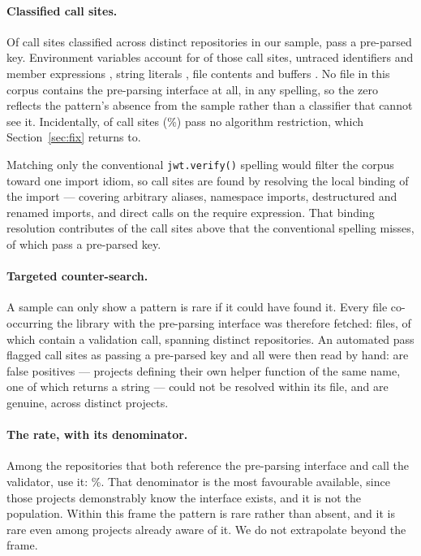 \documentclass[pdflatex,sn-basic,twocolumn]{sn-jnl}%
\begin{document}
\paragraph{Classified call sites.} Of \SampleCallSites{} call sites classified
across \SampleRepos{} distinct repositories in our sample,
\SampleSitesPreparsed{} pass a pre-parsed key. Environment variables account for
\SampleEnvString{} of those call sites, untraced identifiers and member
expressions \SampleUnknown{}, string literals \SampleStringLiteral{}, file
contents \SampleFileContents{} and buffers \SampleBuffer. No file in this corpus
contains the pre-parsing interface at all, in any spelling, so the zero reflects
the pattern's absence from the sample rather than a classifier that cannot see
it. Incidentally, \SampleNoAlgorithms{} of \SampleCallSites{} call sites
(\SampleNoAlgorithmsPct\%) pass no algorithm restriction, which
Section~\ref{sec:fix} returns to.

Matching only the conventional \texttt{jwt.verify()} spelling would filter the
corpus toward one import idiom, so call sites are found by resolving the local
binding of the import --- covering arbitrary aliases, namespace imports,
destructured and renamed imports, and direct calls on the require expression.
That binding resolution contributes \SampleRematchAdded{} of the call sites
above that the conventional spelling misses, of which \RematchSitesPreparsed{}
pass a pre-parsed key.

\paragraph{Targeted counter-search.} A sample can only show a pattern is rare if
it could have found it. Every file co-occurring the library with the pre-parsing
interface was therefore fetched: \CounterFilesFetched{} files, of which
\CounterWithVerify{} contain a validation call, spanning
\CounterReposWithVerify{} distinct repositories. An automated pass flagged
\AdjudicatedTotal{} call sites as passing a pre-parsed key and all were then read
by hand: \AdjudicatedFalsePositive{} are false positives --- projects defining
their own helper function of the same name, one of which returns a string ---
\AdjudicatedUnresolved{} could not be resolved within its file, and
\AdjudicatedGenuine{} are genuine, across \AdjudicatedGenuineProjects{} distinct
projects.

\paragraph{The rate, with its denominator.} Among the \CounterReposWithVerify{}
repositories that both reference the pre-parsing interface and call the
validator, \AdjudicatedGenuineProjects{} use it: \AdjudicatedGenuinePct\%. That
denominator is the most favourable available, since those projects demonstrably
know the interface exists, and it is not the population. Within this frame the
pattern is rare rather than absent, and it is rare even among projects already
aware of it. We do not extrapolate beyond the frame.
\end{document}
